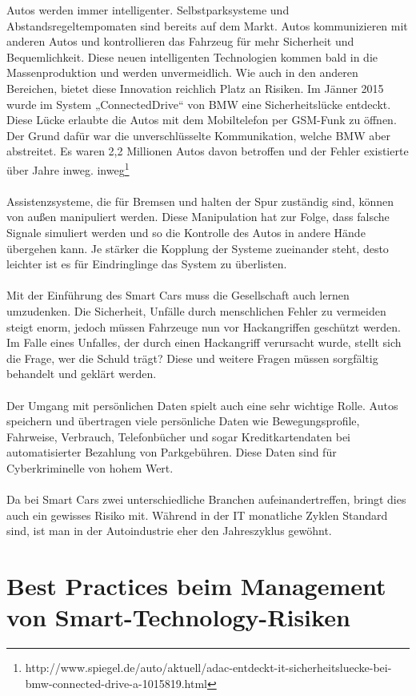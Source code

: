 \documentclass{report}
\begin{document}
Autos werden immer intelligenter. Selbstparksysteme und Abstandsregeltempomaten sind bereits auf dem Markt. Autos kommunizieren mit anderen Autos und kontrollieren das Fahrzeug für mehr Sicherheit und Bequemlichkeit. Diese neuen intelligenten Technologien kommen bald in die Massenproduktion und werden unvermeidlich. Wie auch in den anderen Bereichen, bietet diese Innovation reichlich Platz an Risiken.
Im Jänner 2015 wurde im System „ConnectedDrive“ von BMW eine Sicherheitslücke entdeckt. Diese Lücke erlaubte die Autos mit dem Mobiltelefon per GSM-Funk zu öffnen. Der Grund dafür war die unverschlüsselte Kommunikation, welche BMW aber abstreitet. Es waren 2,2 Millionen Autos davon betroffen und der Fehler existierte über Jahre inweg. inweg\footnote{http://www.spiegel.de/auto/aktuell/adac-entdeckt-it-sicherheitsluecke-bei-bmw-connected-drive-a-1015819.html}
\\
\\
Assistenzsysteme, die für Bremsen und halten der Spur zuständig sind, können von außen manipuliert werden. Diese Manipulation hat zur Folge, dass falsche Signale simuliert werden und so die Kontrolle des Autos in andere Hände übergehen kann. Je stärker die Kopplung der Systeme zueinander steht, desto leichter ist es für Eindringlinge das System zu überlisten.
\\
\\
Mit der Einführung des Smart Cars muss die Gesellschaft auch lernen umzudenken. Die Sicherheit, Unfälle durch menschlichen Fehler zu vermeiden steigt enorm, jedoch müssen Fahrzeuge nun vor Hackangriffen geschützt werden. Im Falle eines Unfalles, der durch einen Hackangriff verursacht wurde, stellt sich die Frage, wer die Schuld trägt? Diese und weitere Fragen müssen sorgfältig behandelt und geklärt werden.
\\
\\
Der Umgang mit persönlichen Daten spielt auch eine sehr wichtige Rolle. Autos speichern und übertragen viele persönliche Daten wie Bewegungsprofile, Fahrweise, Verbrauch, Telefonbücher und sogar Kreditkartendaten bei automatisierter Bezahlung von Parkgebühren. Diese Daten sind für Cyberkriminelle von hohem Wert.
\\
\\
Da bei Smart Cars zwei unterschiedliche Branchen aufeinandertreffen, bringt dies auch ein gewisses Risiko mit.  Während in der IT monatliche Zyklen Standard sind, ist man in der Autoindustrie eher den Jahreszyklus gewöhnt. 

\section{Best Practices beim Management von Smart-Technology-Risiken}
\end{document}

